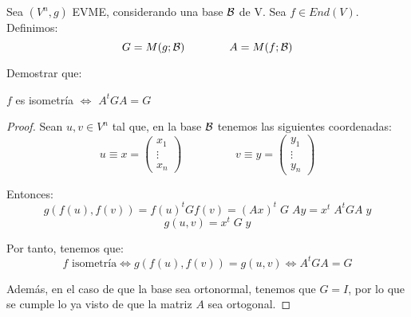 \begin{ejercicio}
    Sea $(V^n, g)$ EVME, considerando una base $\mathcal{B}$ de V. Sea $f\in End(V)$. Definimos:
    \begin{equation*}
        G=M(g;\mathcal{B}) \qquad \qquad A=M(f;\mathcal{B})
    \end{equation*}

    Demostrar que:
    \begin{center}
        $f$ es isometría $\Longleftrightarrow$ $A^tGA = G$
    \end{center}

    \begin{proof}
        Sean $u,v\in V^n$ tal que, en la base $\mathcal{B}$ tenemos las siguientes coordenadas:
        $$u\equiv x = \left(\begin{array}{c}
            x_1 \\ \vdots \\ x_n
        \end{array}\right) \hspace{2cm} v\equiv y = \left(\begin{array}{c}
            y_1 \\ \vdots \\ y_n
        \end{array}\right)$$

        Entonces:
        \begin{equation*}
            g(f(u), f(v)) = f(u)^t G f(v) = (Ax)^t\;G\;Ay = x^t\;A^tGA\;y
        \end{equation*}
        \begin{equation*}
            g(u,v) = x^t\;G\;y
        \end{equation*}

        Por tanto, tenemos que:
        \begin{equation*}
            f \text{ isometría} \Longleftrightarrow g(f(u), f(v)) = g(u,v) \Longleftrightarrow A^tGA = G
        \end{equation*}

        Además, en el caso de que la base sea ortonormal, tenemos que $G=I$, por lo que se cumple lo ya visto de que la matriz $A$ sea ortogonal.
    \end{proof}
    
\end{ejercicio}


